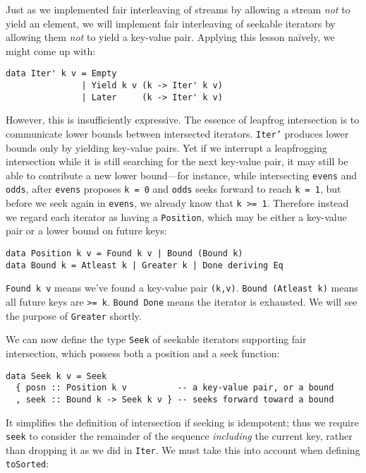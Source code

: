 \documentclass[acmsmall,screen,review,anonymous,dvipsnames,svgnames]{acmart}
\newcommand\hask[1]{\texttt{#1}}
\newcommand\ttt\texttt
\begin{document}
Just as we implemented fair interleaving of streams by allowing a stream \emph{not} to yield an element, we will implement fair interleaving of seekable iterators by allowing them \emph{not} to yield a key-value pair.
Applying this lesson na\"ively, we might come up with:

\begin{verbatim}
data Iter' k v = Empty
               | Yield k v (k -> Iter' k v)
               | Later     (k -> Iter' k v)
\end{verbatim}

\noindent
However, this is insufficiently expressive.
The essence of leapfrog intersection is to communicate lower bounds between intersected iterators.
\hask{Iter'} produces lower bounds only by yielding key-value pairs.
Yet if we interrupt a leapfrogging intersection while it is still searching for the next key-value pair, it may still be able to contribute a new lower bound---for instance, while intersecting \ttt{evens} and \ttt{odds}, after \ttt{evens} proposes \ttt{k = 0} and \ttt{odds} seeks forward to reach \ttt{k = 1}, but before we seek again in \ttt{evens}, we already know that \ttt{k >= 1}.
%
Therefore instead we regard each iterator as having a \hask{Position}, which may be either a key-value pair or a lower bound on future keys:

\begin{verbatim}
data Position k v = Found k v | Bound (Bound k)
data Bound k = Atleast k | Greater k | Done deriving Eq
\end{verbatim}

\noindent
\hask{Found k v} means we've found a key-value pair \ttt{(k,v)}.
\hask{Bound (Atleast k)} means all future keys are \ttt{>= k}.
\hask{Bound Done} means the iterator is exhausted.
We will see the purpose of \hask{Greater} shortly.

We can now define the type \hask{Seek} of seekable iterators supporting fair intersection, which possess both a position and a seek function:

\begin{verbatim}
data Seek k v = Seek
  { posn :: Position k v          -- a key-value pair, or a bound
  , seek :: Bound k -> Seek k v } -- seeks forward toward a bound
\end{verbatim}

\noindent
It simplifies the definition of intersection if seeking is idempotent; thus we require \ttt{seek} to consider the remainder of the sequence \emph{including} the current key, rather than dropping it as we did in \hask{Iter}.
We must take this into account when defining \ttt{toSorted}:
\end{document}
